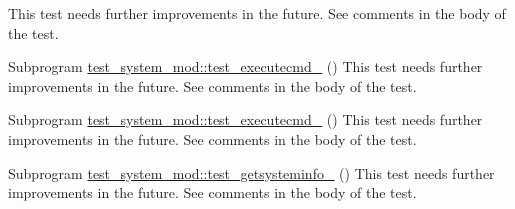 \begin{DoxyRefList}
%
 This test needs further improvements in the future. See comments in the body of the test.  
\item[Subprogram \mbox{\hyperlink{namespacetest__system__mod_ad3628bdc53886a25eaaeed8a21fa4f30}{test\+\_\+system\+\_\+mod\+::test\+\_\+executecmd\+\_\+1}} ()]\label{todo__todo000026}%
%
 This test needs further improvements in the future. See comments in the body of the test.  
\item[Subprogram \mbox{\hyperlink{namespacetest__system__mod_ad33f793a941b64ab6ab4a6eb6904ffc2}{test\+\_\+system\+\_\+mod\+::test\+\_\+executecmd\+\_\+2}} ()]\label{todo__todo000027}%
%
 This test needs further improvements in the future. See comments in the body of the test.  
\item[Subprogram \mbox{\hyperlink{namespacetest__system__mod_a0dc8162005f27942e79c44fca822834e}{test\+\_\+system\+\_\+mod\+::test\+\_\+getsysteminfo\+\_\+1}} ()]\label{todo__todo000028}%
%
 This test needs further improvements in the future. See comments in the body of the test. 
\end{DoxyRefList}